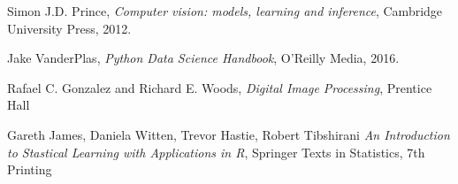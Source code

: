 \documentclass[a4paper,twoside,12pt]{report}
\begin{document}


\nocite{*}


\begin{thebibliography}{9}

  Simon J.D. Prince,
  \textit{Computer vision: models, learning and inference},
  Cambridge University Press,
  2012.

  Jake VanderPlas,
  \textit{Python Data Science Handbook},
  O'Reilly Media,
  2016.

  Rafael C. Gonzalez and Richard E. Woods,
  \textit{Digital Image Processing},
  Prentice Hall

  Gareth James, Daniela Witten, Trevor Hastie, Robert Tibshirani
  \textit{An Introduction to Stastical Learning with Applications in R},
  Springer Texts in Statistics,
   7th Printing	
\end{thebibliography}
\end{document}
